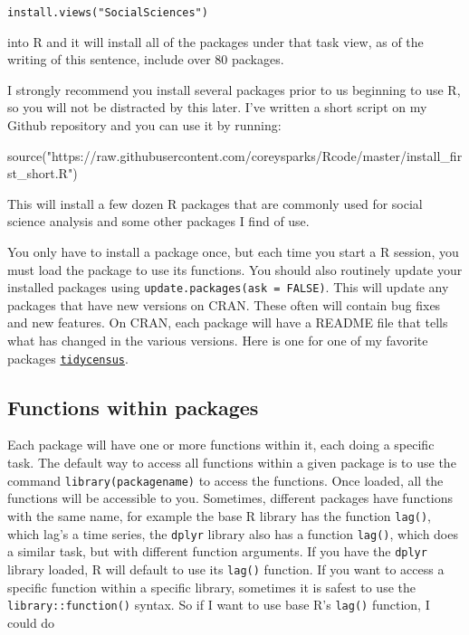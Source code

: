 \documentclass[
  letterpaper,
  DIV=11,
  numbers=noendperiod]{scrreprt}
\newenvironment{Shaded}{\begin{snugshade}}{\end{snugshade}}
\newcommand{\FunctionTok}[1]{\textcolor[rgb]{0.28,0.35,0.67}{#1}}
\newcommand{\NormalTok}[1]{\textcolor[rgb]{0.00,0.23,0.31}{#1}}
\newcommand{\StringTok}[1]{\textcolor[rgb]{0.13,0.47,0.30}{#1}}
\begin{document}
\texttt{install.views("SocialSciences")}

into R and it will install all of the packages under that task view, as
of the writing of this sentence, include over 80 packages.

I strongly recommend you install several packages prior to us beginning
to use R, so you will not be distracted by this later. I've written a
short script on my Github repository and you can use it by running:

\begin{Shaded}
\begin{Highlighting}[]
\FunctionTok{source}\NormalTok{(}\StringTok{"https://raw.githubusercontent.com/coreysparks/Rcode/master/install\_first\_short.R"}\NormalTok{)}
\end{Highlighting}
\end{Shaded}

This will install a few dozen R packages that are commonly used for
social science analysis and some other packages I find of use.

You only have to install a package once, but each time you start a R
session, you must load the package to use its functions. You should also
routinely update your installed packages using
\texttt{update.packages(ask\ =\ FALSE)}. This will update any packages
that have new versions on CRAN. These often will contain bug fixes and
new features. On CRAN, each package will have a README file that tells
what has changed in the various versions. Here is one for one of my
favorite packages
\href{https://cran.r-project.org/web/packages/tidycensus/readme/README.html}{\texttt{tidycensus}}.

\hypertarget{functions-within-packages}{%
\subsection{Functions within packages}\label{functions-within-packages}}

Each package will have one or more functions within it, each doing a
specific task. The default way to access all functions within a given
package is to use the command \texttt{library(packagename)} to access
the functions. Once loaded, all the functions will be accessible to you.
Sometimes, different packages have functions with the same name, for
example the base R library has the function \texttt{lag()}, which lag's
a time series, the \texttt{dplyr} library also has a function
\texttt{lag()}, which does a similar task, but with different function
arguments. If you have the \texttt{dplyr} library loaded, R will default
to use its \texttt{lag()} function. If you want to access a specific
function within a specific library, sometimes it is safest to use the
\texttt{library::function()} syntax. So if I want to use base R's
\texttt{lag()} function, I could do
\end{document}
